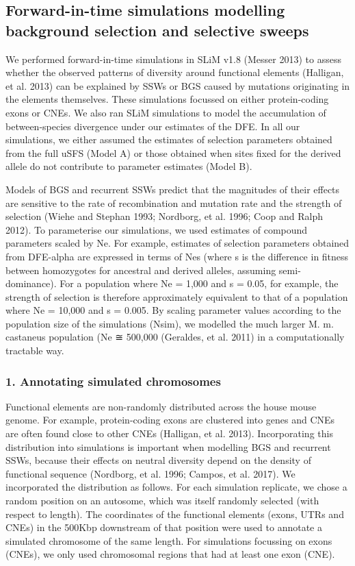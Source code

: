 \subsection{Forward-in-time simulations modelling background selection and selective sweeps}
 
We performed forward-in-time simulations in SLiM v1.8 (Messer 2013) to assess whether the observed patterns of diversity around functional elements (Halligan, et al. 2013) can be explained by SSWs or BGS caused by mutations originating in the elements themselves. These simulations focussed on either protein-coding exons or CNEs. We also ran SLiM simulations to model the accumulation of between-species divergence under our estimates of the DFE. In all our simulations, we either assumed the estimates of selection parameters obtained from the full uSFS (Model A) or those obtained when sites fixed for the derived allele do not contribute to parameter estimates (Model B).

Models of BGS and recurrent SSWs predict that the magnitudes of their effects are sensitive to the rate of recombination and mutation rate and the strength of selection (Wiehe and Stephan 1993; Nordborg, et al. 1996; Coop and Ralph 2012). To parameterise our simulations, we used estimates of compound parameters scaled by Ne. For example, estimates of selection parameters obtained from DFE-alpha are expressed in terms of Nes (where s is the difference in fitness between homozygotes for ancestral and derived alleles, assuming semi-dominance). For a population where Ne = 1,000 and s = 0.05, for example, the strength of selection is therefore approximately equivalent to that of a population where Ne = 10,000 and s = 0.005. By scaling parameter values according to the population size of the simulations (Nsim), we modelled the much larger M. m. castaneus population (Ne ≅ 500,000 (Geraldes, et al. 2011) in a computationally tractable way.

\subsubsection{1. Annotating simulated chromosomes}

Functional elements are non-randomly distributed across the house mouse genome. For example, protein-coding exons are clustered into genes and CNEs are often found close to other CNEs (Halligan, et al. 2013). Incorporating this distribution into simulations is important when modelling BGS and recurrent SSWs, because their effects on neutral diversity depend on the density of functional sequence (Nordborg, et al. 1996; Campos, et al. 2017). We incorporated the distribution as follows. For each simulation replicate, we chose a random position on an autosome, which was itself randomly selected (with respect to length). The coordinates of the functional elements (exons, UTRs and CNEs) in the 500Kbp downstream of that position were used to annotate a simulated chromosome of the same length. For simulations focussing on exons (CNEs), we only used chromosomal regions that had at least one exon (CNE).

